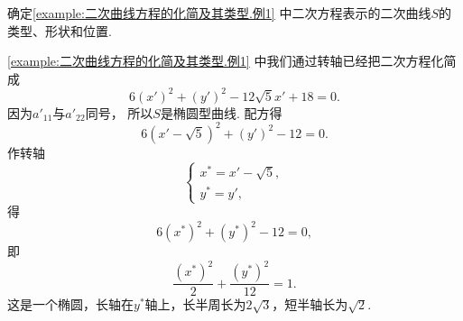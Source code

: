 \begin{example}
确定\cref{example:二次曲线方程的化简及其类型.例1} 中二次方程表示的二次曲线\(S\)的类型、形状和位置.
\begin{solution}
\cref{example:二次曲线方程的化简及其类型.例1} 中我们通过转轴已经把二次方程化简成\begin{equation*}
	6(x')^2 + (y')^2 - 12\sqrt5 x' + 18 = 0.
\end{equation*}
因为\(a'_{11}\)与\(a'_{22}\)同号，
所以\(S\)是椭圆型曲线.
配方得\begin{equation*}
	6(x' - \sqrt5)^2 + (y')^2 - 12 = 0.
\end{equation*}
作转轴\begin{equation*}
	\left\{ \begin{array}{l}
		x^* = x' - \sqrt5, \\
		y^* = y',
	\end{array} \right.
\end{equation*}
得\begin{equation*}
	6(x^*)^2 + (y^*)^2 - 12 = 0,
\end{equation*}
即\begin{equation*}
	\frac{(x^*)^2}{2} + \frac{(y^*)^2}{12} = 1.
\end{equation*}
这是一个椭圆，长轴在\(y^*\)轴上，长半周长为\(2\sqrt3\)，短半轴长为\(\sqrt2\).
\end{solution}
\end{example}
